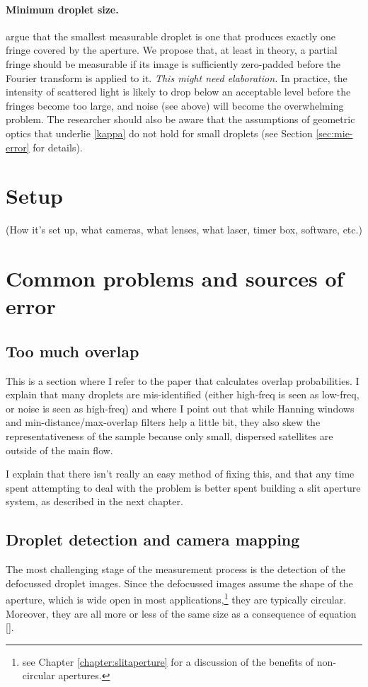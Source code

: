 \documentclass[10pt]{book}
\begin{document}
\paragraph{Minimum droplet size.}
\citet{Damaschke02} argue that the smallest measurable droplet is one that
produces exactly one fringe covered by the aperture. We propose that, at least
in theory, a partial fringe should be measurable if its image is sufficiently
zero-padded before the Fourier transform is applied to it. \emph{This might need
elaboration.} In practice, the intensity of scattered light is likely to drop
below an acceptable level before the fringes become too large, and noise (see
above) will become the overwhelming problem. The researcher should also be aware
that the assumptions of geometric optics that underlie \eqref{kappa} do
not hold for small droplets (see Section \ref{sec:mie-error} for details).

\section{Setup}
\label{sec:ipi-setup}
(How it's set up, what cameras, what lenses, what laser, timer box, software,
etc.)

\section{Common problems and sources of error}
\subsection{Too much overlap}
\label{sec:ipi-overlap}
This is a section where I refer to the paper that calculates overlap
probabilities. I explain that many droplets are mis-identified (either high-freq
is seen as low-freq, or noise is seen as high-freq) and where I point out that
while Hanning windows and min-distance/max-overlap filters help a little bit,
they also skew the representativeness of the sample because only small,
dispersed satellites are outside of the main flow.

I explain that there isn't really an easy method of fixing this, and that any
time spent attempting to deal with the problem is better spent building a slit
aperture system, as described in the next chapter.

\subsection{Droplet detection and camera mapping}
The most challenging stage of the measurement process is the detection of the
defocussed droplet images. Since the defocussed images assume the shape of the
aperture, which is wide open in most applications,\footnote{see Chapter
\ref{chapter:slitaperture} for a discussion of the benefits of non-circular
apertures.} they are typically circular. Moreover, they are all more or less of
the same size as a consequence of equation \eqref{}.
\end{document}

